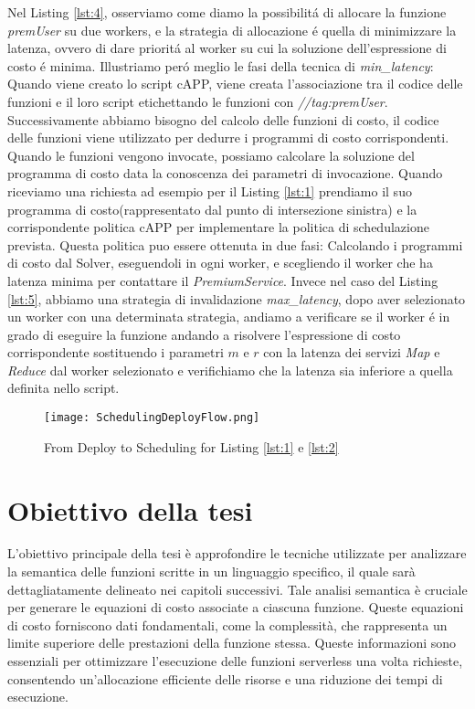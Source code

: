 \documentclass[../../main.tex]{subfiles}
\begin{document}
Nel Listing \ref{lst:4}, osserviamo come diamo la possibilitá di allocare la funzione \textit{premUser} su due workers, e la strategia di allocazione é quella di minimizzare la latenza, ovvero di dare prioritá al worker su cui la soluzione dell'espressione di costo é minima.
Illustriamo peró meglio le fasi della tecnica di \textit{min\_latency}:\\
Quando viene creato lo script cAPP, viene creata l'associazione tra il codice delle funzioni e il loro script etichettando le funzioni con \textit{//tag:premUser}.
Successivamente abbiamo bisogno del calcolo delle funzioni di costo, il codice delle funzioni viene utilizzato per dedurre i programmi di costo corrispondenti.
Quando le funzioni vengono invocate, possiamo calcolare la soluzione del programma di costo data la conoscenza dei parametri di invocazione.
Quando riceviamo una richiesta ad esempio per il Listing \ref{lst:1} prendiamo il suo programma di costo(rappresentato dal punto di intersezione sinistra) e la corrispondente politica cAPP per implementare la politica di schedulazione prevista.
Questa politica puo essere ottenuta in due fasi: Calcolando i programmi di costo dal Solver, eseguendoli in ogni worker, e scegliendo il worker che ha latenza minima per contattare il \textit{PremiumService}.
Invece nel caso del Listing \ref{lst:5}, abbiamo una strategia di invalidazione \textit{max\_latency}, dopo aver selezionato un worker con una determinata strategia, andiamo a verificare se il worker é in grado di eseguire la funzione andando a risolvere l'espressione di costo corrispondente sostituendo i parametri $m$ e $r$ con la latenza dei servizi \textit{Map} e \textit{Reduce} dal worker selezionato e verifichiamo che la latenza sia inferiore a quella definita nello script.\autocite{deserverless}
\begin{figure}[H]
    \texttt{[image: SchedulingDeployFlow.png]}
    \centering
    \caption{From Deploy to Scheduling for Listing \ref{lst:1} e \ref{lst:2} }
\end{figure}

\section{Obiettivo della tesi}
L'obiettivo principale della tesi è approfondire le tecniche utilizzate per analizzare la semantica delle funzioni scritte in un linguaggio specifico, il quale sarà dettagliatamente delineato nei capitoli successivi. Tale analisi semantica è cruciale per generare le equazioni di costo associate a ciascuna funzione. Queste equazioni di costo forniscono dati fondamentali, come la complessità, che rappresenta un limite superiore delle prestazioni della funzione stessa. Queste informazioni sono essenziali per ottimizzare l'esecuzione delle funzioni serverless una volta richieste, consentendo un'allocazione efficiente delle risorse e una riduzione dei tempi di esecuzione.
\end{document}
